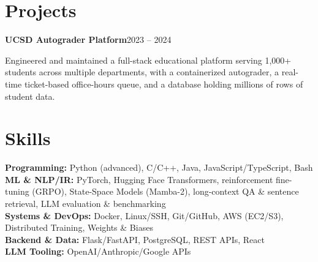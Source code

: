 \documentclass[11pt]{article}
\newcommand{\entry}[2]{\noindent\textbf{#1}\hfill #2\par}
\begin{document}
\section{Projects}
\entry{UCSD Autograder Platform}{2023 -- 2024}
Engineered and maintained a full-stack educational platform serving 1,000+ students across multiple departments, with a containerized autograder, a real-time ticket-based office-hours queue, and a database holding millions of rows of student data.

\section{Skills}
\textbf{Programming:} Python (advanced), C/C++, Java, JavaScript/TypeScript, Bash\\
\textbf{ML \& NLP/IR:} PyTorch, Hugging Face Transformers, reinforcement fine-tuning (GRPO), State-Space Models (Mamba-2), long-context QA \& sentence retrieval, LLM evaluation \& benchmarking\\
\textbf{Systems \& DevOps:} Docker, Linux/SSH, Git/GitHub, AWS (EC2/S3), Distributed Training, Weights \& Biases\\
\textbf{Backend \& Data:} Flask/FastAPI, PostgreSQL, REST APIs, React\\
\textbf{LLM Tooling:} OpenAI/Anthropic/Google APIs
\end{document}
